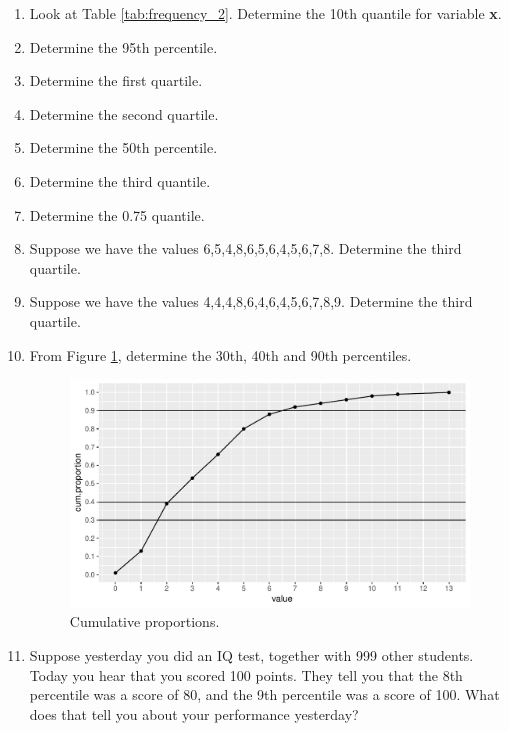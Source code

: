 \documentclass[]{report}\usepackage[]{graphicx}\usepackage[]{color}
\makeatletter
\def\maxwidth{ %
  \ifdim\Gin@nat@width>\linewidth
    \linewidth
  \else
    \Gin@nat@width
  \fi
}
\makeatother
\begin{document}
\begin{enumerate}
\item Look at Table \ref{tab:frequency_2}. Determine the 10th quantile for variable \textbf{x}.

\item Determine the 95th percentile.

\item Determine the first quartile.

\item Determine the second quartile.

\item Determine the 50th percentile.

\item Determine the third quantile.

\item Determine the 0.75 quantile.

\item Suppose we have the values {6,5,4,8,6,5,6,4,5,6,7,8}. Determine the third quartile.

\item Suppose we have the values {4,4,4,8,6,4,6,4,5,6,7,8,9}. Determine the third quartile.

\item From Figure \ref{fig:quartile_3}, determine the 30th, 40th and 90th percentiles.

\begin{figure}

{\centering \includegraphics[width=\maxwidth]{figure/quartile_3-1} 

}

\caption[Cumulative proportions]{Cumulative proportions.}\label{fig:quartile_3}
\end{figure}



\item Suppose yesterday you did an IQ test, together with 999 other students. Today you hear that you scored 100 points. They tell you that the 8th percentile was a score of 80, and the 9th percentile was a score of 100. What does that tell you about your performance yesterday?


\end{enumerate}
\end{document}
